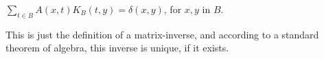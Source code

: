 $\sum_{t \in B} A(x,t) K_B(t,y) = \delta(x,y)$, for $x,y$ in $B$.

This is just the definition of a matrix-inverse, and according to a standard theorem of algebra, this inverse is unique, if it exists.